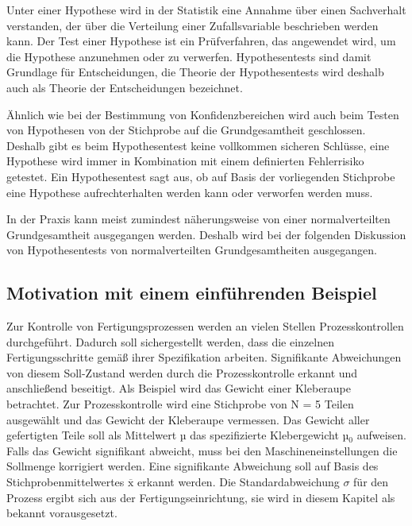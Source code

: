 \noindent Unter einer Hypothese wird in der Statistik eine Annahme \"{u}ber einen Sachverhalt verstanden, der \"{u}ber die Verteilung einer Zufallsvariable beschrieben werden kann. Der Test einer Hypothese ist ein Pr\"{u}fverfahren, das angewendet wird, um die Hypothese anzunehmen oder zu verwerfen. Hypothesentests sind damit Grundlage f\"{u}r Entscheidungen, die Theorie der Hypothesentests wird deshalb auch als Theorie der Entscheidungen bezeichnet.\newline

\noindent \"{A}hnlich wie bei der Bestimmung von Konfidenzbereichen wird auch beim Testen von Hypothesen von der Stichprobe auf die Grundgesamtheit geschlossen. Deshalb gibt es beim Hypothesentest keine vollkommen sicheren Schl\"{u}sse, eine Hypothese wird immer in Kombination mit einem definierten Fehlerrisiko getestet. Ein Hypothesentest sagt aus, ob auf Basis der vorliegenden Stichprobe eine Hypothese aufrechterhalten werden kann oder verworfen werden muss. \newline

\noindent In der Praxis kann meist zumindest n\"{a}herungsweise von einer normalverteilten Grundgesamtheit ausgegangen werden. Deshalb wird bei der folgenden Diskussion von Hypothesentests von normalverteilten Grundgesamtheiten ausgegangen. 


\subsection{Motivation mit einem einf\"{u}hrenden Beispiel}

\noindent Zur Kontrolle von Fertigungsprozessen werden an vielen Stellen Prozesskontrollen durchgef\"{u}hrt. Dadurch soll sichergestellt werden, dass die einzelnen Fertigungsschritte gem\"{a}{\ss} ihrer Spezifikation arbeiten. Signifikante Abweichungen von diesem Soll-Zustand werden durch die Prozesskontrolle erkannt und anschlie{\ss}end beseitigt. Als Beispiel wird das Gewicht einer Kleberaupe betrachtet. Zur Prozesskontrolle wird eine Stichprobe von N = 5 Teilen ausgew\"{a}hlt und das Gewicht der Kleberaupe vermessen. Das Gewicht aller gefertigten Teile soll als Mittelwert µ das spezifizierte Klebergewicht µ$_{0}$ aufweisen. Falls das Gewicht signifikant abweicht, muss bei den Maschineneinstellungen die Sollmenge korrigiert werden. Eine signifikante Abweichung soll auf Basis des Stichprobenmittelwertes $\overline{\mathrm{x}}$ erkannt werden. Die Standardabweichung $\sigma$ f\"{u}r den Prozess ergibt sich aus der Fertigungseinrichtung, sie wird in diesem Kapitel als bekannt vorausgesetzt. \newline

